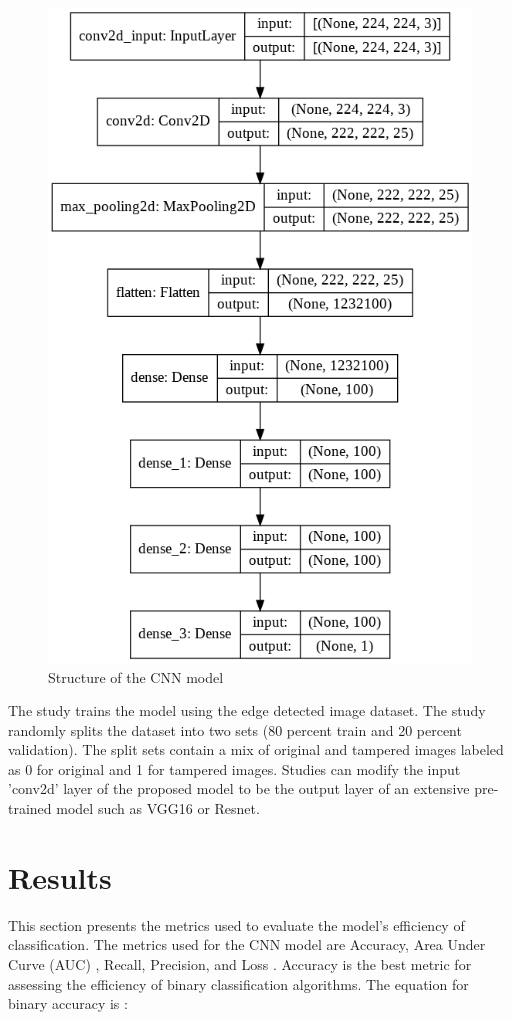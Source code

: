 \documentclass[conference]{IEEEtran}
\begin{document}
\begin{figure}[htpb]
\centerline{\includegraphics[scale = 0.32]{model.png}}
\caption{Structure of the CNN model}
\label{model}
\end{figure}

The study trains the model using the edge detected image dataset. The study randomly splits the dataset into two sets (80 percent train and 20 percent validation). The split sets contain a mix of original and tampered images labeled as 0 for original and 1 for tampered images. Studies can modify the input 'conv2d' layer of the proposed model to be the output layer of an extensive pre-trained model such as VGG16 or Resnet. 


\section{Results}
This section presents the metrics used to evaluate the model's efficiency of classification. The metrics used for the CNN model are Accuracy, Area Under Curve (AUC) \cite{b12}, Recall, Precision, and Loss \cite{b17}. Accuracy is the best metric for assessing the efficiency of binary classification algorithms. The equation for binary accuracy is :
\end{document}

